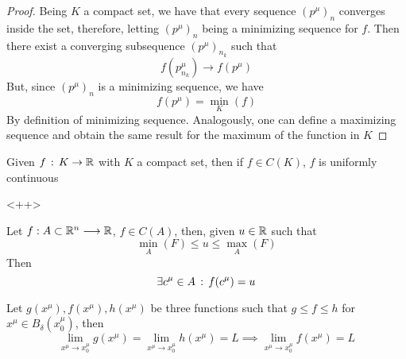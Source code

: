 \documentclass[../complete.tex]{subfiles}
\begin{document}
\begin{proof}
	Being $K$ a compact set, we have that every sequence $(p^\mu)_n$ converges inside the set, therefore, letting $(p^\mu)_n$ being a minimizing sequence for $f$. Then there exist a converging subsequence $(p^\mu)_{n_k}$ such that
	\begin{equation*}
		f(p^\mu_{n_k})\to f(p^\mu)
	\end{equation*}
	But, since $(p^\mu)_n$ is a minimizing sequence, we have
	\begin{equation*}
		f(p^\mu)=\min_{K}(f)
	\end{equation*}
	By definition of minimizing sequence. Analogously, one can define a maximizing sequence and obtain the same result for the maximum of the function in $K$
\end{proof}
\begin{thm}
	Given $f\, :\,  K\to\mathbb{R}$ with $K$ a compact set, then if $f\in C(K)$, $f$ is uniformly continuous
\end{thm}<++>
\begin{thm}
	Let $f:A\subset\mathbb{R}^n\overset{}{\longrightarrow}\mathbb{R}$, $f\in C(A)$, then, given $u\in\mathbb{R}$ such that
	\begin{equation*}
		\min_A(F)\le u\le\max_A(F)
	\end{equation*}
	Then
	\begin{equation*}
		\exists c^\mu\in A\, :\,  f(c^\mu)=u
	\end{equation*}
\end{thm}
\begin{thm}[Squeeze]
	Let $g(x^\mu),f(x^\mu),h(x^\mu)$ be three functions such that $g\le f\le h$ for $x^\mu\in B_\delta(x^\mu_0)$, then
	\begin{equation*}
		\lim_{x^\mu\to x_0^\mu}g(x^\mu)=\lim_{x^\mu\to x_0^\mu}h(x^\mu)=L\implies\lim_{x^\mu\to x_0^\mu}f(x^\mu)=L
	\end{equation*}
\end{thm}
\end{document}
